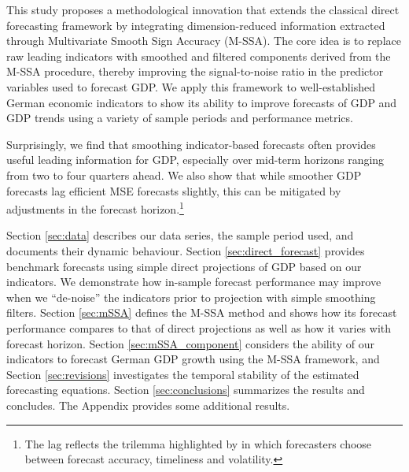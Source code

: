 \documentclass[11pt,a4paper]{article}
\begin{document}
This study proposes a methodological innovation that extends the classical direct forecasting framework by integrating dimension-reduced information extracted through Multivariate Smooth Sign Accuracy (M-SSA). The core idea is to replace raw
leading indicators with smoothed and filtered components derived from the M-SSA procedure, thereby improving the signal-to-noise ratio in the predictor variables used to forecast GDP. We apply this framework to well-established German economic indicators to show its ability to improve forecasts of GDP and GDP trends using a variety of sample periods and performance metrics. 

Surprisingly, we find that smoothing indicator-based forecasts often provides useful leading information for GDP, especially over mid-term horizons ranging from two to four quarters ahead. We also show that while smoother GDP forecasts lag efficient MSE forecasts slightly, this can be mitigated by adjustments in the forecast horizon.\footnote{The lag reflects the trilemma highlighted by \cite{McElroy2019} in which forecasters choose between forecast accuracy, timeliness and volatility.}




Section \ref{sec:data} describes our data series, the sample period used, and documents their dynamic behaviour. Section \ref{sec:direct_forecast} provides benchmark forecasts using simple direct projections of GDP based on our indicators. We demonstrate how in-sample forecast performance may improve when we ``de-noise'' the indicators prior to projection with simple smoothing filters. Section \ref{sec:mSSA} defines the M-SSA method and shows how its forecast performance compares to that of direct projections as well as how it varies with forecast horizon. Section \ref{sec:mSSA_component} considers the ability of our indicators to forecast German GDP growth using the M-SSA framework, and Section \ref{sec:revisions} investigates the temporal stability of the estimated forecasting equations. Section \ref{sec:conclusions} summarizes the results and concludes. The Appendix provides some additional results. 
\end{document}

